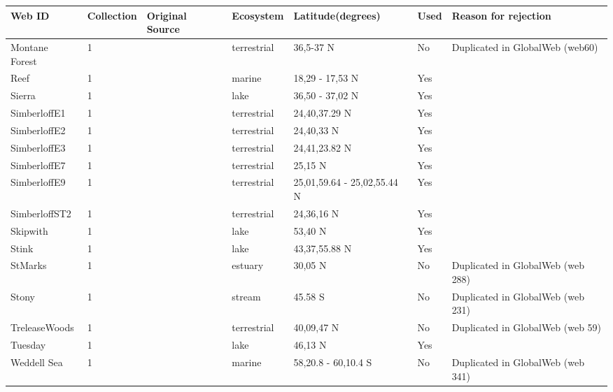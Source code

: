 \documentclass[12pt]{article}
\begin{document}
\begin{landscape}
    \begin{table}[h!]
    \centering
    {\footnotesize
      \begin{tabular}{p{2.8cm}p{1.3cm}p{5.5cm}p{2.2cm}p{2.5cm}lp{3.5cm}}
        \hline
        Web ID & Collection & Original Source & Ecosystem & Latitude(degrees) & Used  & Reason for rejection  \\
        \hline
        Montane Forest & 1 & \citet{Rasmussen1941}    & terrestrial & 36,5-37 N & No    & Duplicated in GlobalWeb (web60) \\
        Reef  & 1 & \citet{Opitz1996}  & marine & 18,29 - 17,53 N & Yes   &       \\
        Sierra & 1 & \citet{Brose2005}    & lake  & 36,50 - 37,02 N & Yes   &       \\
        SimberloffE1 & 1 & \citet{Simberloff1976}  & terrestrial & 24,40,37.29 N & Yes   &       \\
        SimberloffE2 & 1 & \citet{Simberloff1976}  & terrestrial & 24,40,33 N & Yes   &       \\
        SimberloffE3 & 1 & \citet{Simberloff1976}  & terrestrial & 24,41,23.82 N & Yes   &       \\
        SimberloffE7 & 1 & \citet{Simberloff1976}  & terrestrial & 25,15 N & Yes   &       \\
        SimberloffE9 & 1 & \citet{Simberloff1976}  & terrestrial & 25,01,59.64 - 25,02,55.44 N & Yes   &       \\
        SimberloffST2 & 1 & \citet{Simberloff1976}  & terrestrial & 24,36,16 N & Yes   &       \\
        Skipwith & 1 & \citet{Warren1989}  & lake  & 53,40 N & Yes   &       \\
        Stink & 1 & \citet{Havens1992}    & lake  & 43,37,55.88 N & Yes   &       \\
        StMarks & 1 & \citet{Christian1999}    & estuary & 30,05 N & No    & Duplicated in GlobalWeb (web 288) \\
        Stony  & 1 & \citet{Townsend1998}  & stream & 45.58 S & No    & Duplicated in GlobalWeb (web 231) \\
        TreleaseWoods & 1 & \citet{Twomey1945}    & terrestrial & 40,09,47 N & No    & Duplicated in GlobalWeb (web 59) \\
        Tuesday & 1 & \citet{Jonsson2005}    & lake  & 46,13 N & Yes   &       \\
        Weddell Sea & 1 & \citet{Brose2005}  & marine & 58,20.8 - 60,10.4 S & No    & Duplicated in GlobalWeb (web 341) \\

\end{tabular}}
\end{table}
\end{landscape}
\end{document}
